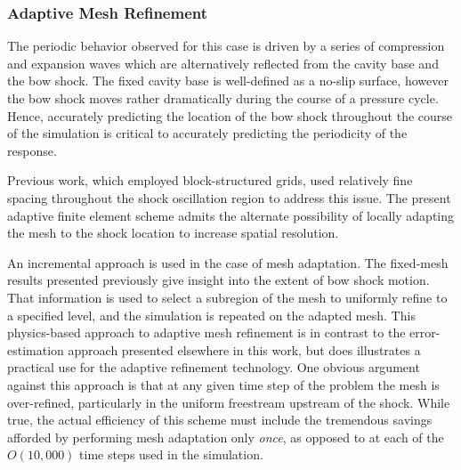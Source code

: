 \subsubsection{Adaptive Mesh Refinement}

The periodic behavior observed for this case is driven by a series of compression and expansion waves which are alternatively reflected from the cavity base and the bow shock.  The fixed cavity base is well-defined as a no-slip surface, however the bow shock moves rather dramatically during the course of a pressure cycle.  Hence, accurately predicting the location of the bow shock throughout the course of the simulation is critical to accurately predicting the periodicity of the response.

Previous work, which employed block-structured grids, used relatively fine spacing throughout the shock oscillation region to address this issue.  The present adaptive finite element scheme admits the alternate possibility of locally adapting the mesh to the shock location to increase spatial resolution.

An incremental approach is used in the case of mesh adaptation.  The fixed-mesh results presented previously give insight into the extent of bow shock motion.  That information is used to select a subregion of the mesh to uniformly refine to a specified level, and the simulation is repeated on the adapted mesh.  This physics-based approach to adaptive mesh refinement is in contrast to the error-estimation approach presented elsewhere in this work, but does illustrates a practical use for the adaptive refinement technology.  One obvious argument against this approach is that at any given time step of the problem the mesh is over-refined, particularly in the uniform freestream upstream of the shock.  While true, the actual efficiency of this scheme must include the tremendous savings afforded by performing mesh adaptation only \emph{once}, as opposed to at each of the $O(10,000)$ time steps used in the simulation.

